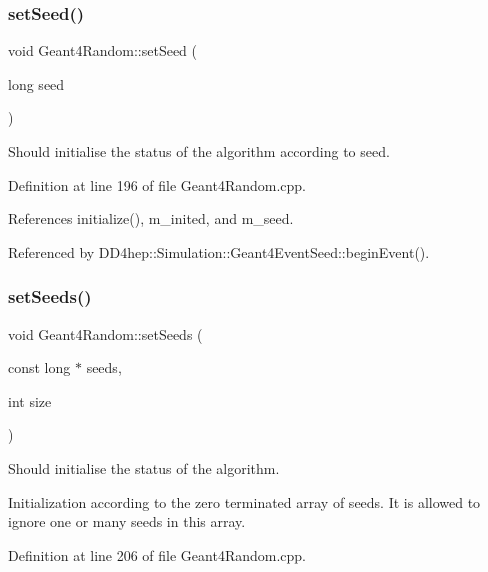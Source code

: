 \subsubsection{\texorpdfstring{set\+Seed()}{setSeed()}}
{\footnotesize\ttfamily void Geant4\+Random\+::set\+Seed (\begin{DoxyParamCaption}\item[{long}]{seed }\end{DoxyParamCaption})\hspace{0.3cm}{\ttfamily [virtual]}}



Should initialise the status of the algorithm according to seed. 



Definition at line 196 of file Geant4\+Random.\+cpp.



References initialize(), m\+\_\+inited, and m\+\_\+seed.



Referenced by D\+D4hep\+::\+Simulation\+::\+Geant4\+Event\+Seed\+::begin\+Event().

\hypertarget{class_d_d4hep_1_1_simulation_1_1_geant4_random_af110cf82c38501f6a437f3b0b7fc9bf4}{}\label{class_d_d4hep_1_1_simulation_1_1_geant4_random_af110cf82c38501f6a437f3b0b7fc9bf4} 
\subsubsection{\texorpdfstring{set\+Seeds()}{setSeeds()}}
{\footnotesize\ttfamily void Geant4\+Random\+::set\+Seeds (\begin{DoxyParamCaption}\item[{const long $\ast$}]{seeds,  }\item[{int}]{size }\end{DoxyParamCaption})\hspace{0.3cm}{\ttfamily [virtual]}}



Should initialise the status of the algorithm. 

Initialization according to the zero terminated array of seeds. It is allowed to ignore one or many seeds in this array. 

Definition at line 206 of file Geant4\+Random.\+cpp.




